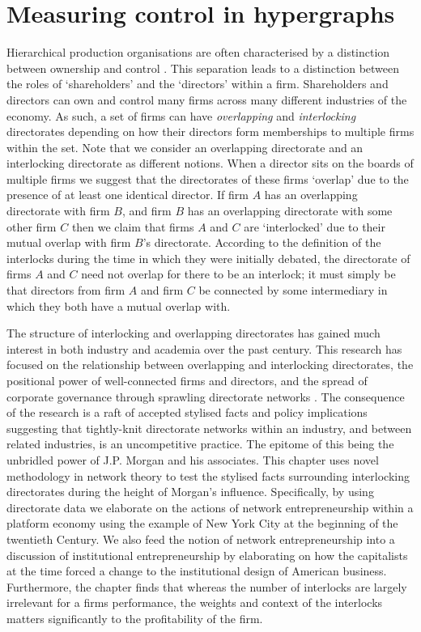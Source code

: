 \chapter{Measuring control in hypergraphs}

Hierarchical production organisations are often characterised by a distinction between ownership and control \citep{JensenMeckling1976, FamaJensen1983}. This separation leads to a distinction between the roles of `shareholders' and the `directors' within a firm. Shareholders and directors can own and control many firms across many different industries of the economy. As such, a set of firms can have \emph{overlapping} and \emph{interlocking} directorates depending on how their directors form memberships to multiple firms within the set. Note that we consider an overlapping directorate and an interlocking directorate as different notions. When a director sits on the boards of multiple firms we suggest that the directorates of these firms `overlap' due to the presence of at least one identical director. If firm $A$ has an overlapping directorate with firm $B$, and firm $B$ has an overlapping directorate with some other firm $C$ then we claim that firms $A$ and $C$ are `interlocked' due to their mutual overlap with firm $B$'s directorate. According to the definition of the interlocks during the time in which they were initially debated, the directorate of firms $A$ and $C$ need not overlap for there to be an interlock; it must simply be that directors from firm $A$ and firm $C$ be connected by some intermediary in which they both have a mutual overlap with.

The structure of interlocking and overlapping directorates has gained much interest in both industry and academia over the past century. This research has focused on the relationship between overlapping and interlocking directorates, the positional power of well-connected firms and directors, and the spread of corporate governance through sprawling directorate networks \citep{RoyBonacich1988}. The consequence of the research is a raft of accepted stylised facts and policy implications suggesting that tightly-knit directorate networks within an industry, and between related industries, is an uncompetitive practice. The epitome of this being the unbridled power of J.P. Morgan and his associates. This chapter uses novel methodology in network theory to test the stylised facts surrounding interlocking directorates during the height of Morgan's influence. Specifically, by using directorate data we elaborate on the actions of network entrepreneurship within a platform economy using the example of New York City at the beginning of the twentieth Century. We also feed the notion of network entrepreneurship into a discussion of institutional entrepreneurship by elaborating on how the capitalists at the time forced a change to the institutional design of American business. Furthermore, the chapter finds that whereas the number of interlocks are largely irrelevant for a firms performance, the weights and context of the interlocks matters significantly to the profitability of the firm.

